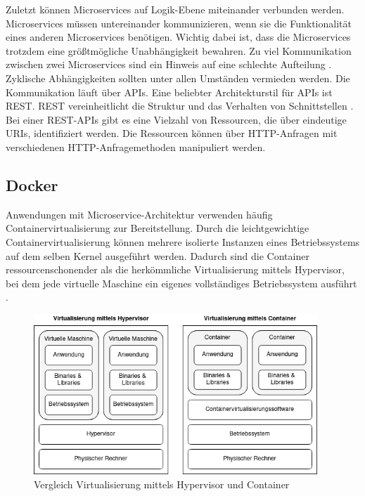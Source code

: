 Zuletzt können Microservices auf Logik-Ebene miteinander verbunden werden. Microservices müssen untereinander kommunizieren, wenn sie die Funktionalität eines anderen Microservices benötigen. Wichtig dabei ist, dass die Microservices trotzdem eine größtmögliche Unabhängigkeit bewahren. Zu viel Kommunikation zwischen zwei Microservices sind ein Hinweis auf eine schlechte Aufteilung \parencite[vgl.][S. 104]{wolffMicroservices2018}. Zyklische Abhängigkeiten sollten unter allen Umständen vermieden werden. Die Kommunikation läuft über \acp{API}. Eine beliebter Architekturstil für \acp{API} ist \ac{REST}. \ac{REST} vereinheitlicht die Struktur und das Verhalten von Schnittstellen \parencite[vgl.][S. 76]{fieldingArchitectural2000}. Bei einer \ac{REST}-\acp{API} gibt es eine Vielzahl von Ressourcen, die über eindeutige \acp{URI}, identifiziert werden. Die Ressourcen können über \acs{HTTP}-Anfragen mit verschiedenen \acs{HTTP}-Anfragemethoden manipuliert werden.

\subsection{Docker}

Anwendungen mit Microservice-Architektur verwenden häufig Containervirtualisierung zur Bereitstellung. Durch die leichtgewichtige Containervirtualisierung können mehrere isolierte Instanzen eines Betriebssystems auf dem selben Kernel ausgeführt werden. Dadurch sind die Container ressourcenschonender als die herkömmliche Virtualisierung mittels Hypervisor, bei dem jede virtuelle Maschine ein eigenes vollständiges Betriebssystem ausführt \parencite[vgl.][S. 166f]{newmanMicroservices2015}.

\begin{figure}[H] 
    \centering
    \includegraphics[width=0.95\textwidth]{figures/VergleichVirtualisierung.png}
    \caption{Vergleich Virtualisierung mittels Hypervisor und Container}
\end{figure}

